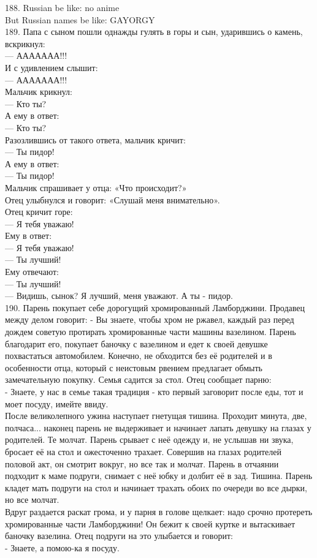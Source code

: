 \documentclass[a4paper,20pt,notitlepage]{extbook}
\begin{document}
	188. Russian be like: no anime\\
	But Russian names be like: GAYORGY\\
	
	189. Папа с сыном пошли однажды гулять в горы и сын, ударившись о камень, вскрикнул:\\
	— ААААААА!!!\\
	И с удивлением слышит:\\
	— ААААААА!!!\\
	Мальчик крикнул:\\
	— Кто ты?\\
	А ему в ответ:\\
	— Кто ты?\\
	Разозлившись от такого ответа, мальчик кричит:\\
	— Ты пидор!\\
	А ему в ответ:\\
	— Ты пидор!\\
	Мальчик спрашивает у отца: «Что происходит?»\\
	Отец улыбнулся и говорит: «Слушай меня внимательно».\\
	Отец кричит горе:\\
	— Я тебя уважаю!\\
	Ему в ответ:\\
	— Я тебя уважаю!\\
	— Ты лучший!\\
	Ему отвечают:\\
	— Ты лучший!\\
	— Видишь, сынок? Я лучший, меня уважают. А ты - пидор.\\
	
	190. Парень покупает себе дорогущий хромированный Ламборджини. Продавец между делом говорит:
	- Вы знаете, чтобы хром не ржавел, каждый раз перед дождем советую протирать хромированные части машины вазелином.
	Парень благодарит его, покупает баночку с вазелином и едет к своей девушке похвастаться автомобилем. Конечно, не обходится без её родителей и в особенности отца, который с неистовым рвением предлагает обмыть замечательную покупку. Семья садится за стол. Отец сообщает парню:\\
	- Знаете, у нас в семье такая традиция - кто первый заговорит после еды, тот и моет посуду, имейте ввиду.\\
	После великолепного ужина наступает гнетущая тишина. Проходит минута, две, полчаса... наконец парень не выдерживает и начинает лапать девушку на глазах у родителей. Те молчат. Парень срывает с неё одежду и, не услышав ни звука, бросает её на стол и ожесточенно трахает. Совершив на глазах родителей половой акт, он смотрит вокруг, но все так и молчат.
	Парень в отчаянии подходит к маме подруги, снимает с неё юбку и долбит её в зад. Тишина. Парень кладет мать подруги на стол и начинает трахать обоих по очереди во все дырки, но все молчат.\\
	Вдруг раздается раскат грома, и у парня в голове щелкает: надо срочно протереть хромированные части Ламборджини! Он бежит к своей куртке и вытаскивает баночку вазелина. Отец подруги на это улыбается и говорит:\\
	- Знаете, а помою-ка я посуду.\\
	
\end{document}
